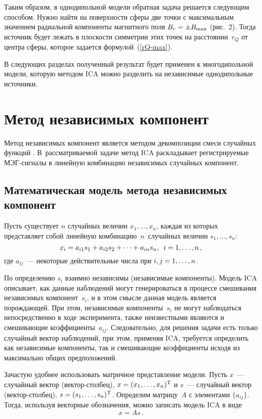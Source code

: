 \begin{multicols}{2}
Таким образом, в однодипольной модели обратная задача решается
следующим способом. Нужно найти на поверхности сферы две точки с
максимальным значением радиальной компоненты магнитного поля $B_r \hm=
\pm B_{\max}$ (рис.~2). Тогда источник будет лежать в
плоскости симметрии этих точек на расстоянии~$r_Q$ от центра сферы,
которое задается формулой~(\ref{rQ-max}).



В следующих разделах полученный результат будет применен к
многодипольной модели, которую методом ICA можно разделить  на
независимые однодипольные источники.

\section{Метод независимых компонент}

Метод независимых компонент
является методом декомпозиции смеси случайных функций \cite{ICA}.
В~рассматриваемой задаче метод ICA раскладывает регистрируемые
МЭГ-сиг\-на\-лы в линейную комбинацию независимых случайных компонент.

\subsection{Математическая модель метода независимых компонент}

Пусть существует $n$ случайных величин $x_{1}, \ldots, x_{n}$,
каждая из которых представляет собой линейную комбинацию~$n$~случайных
величин $s_{1}, \ldots, s_{n}$:
$$
x_{i} = a_{i1}s_{1} + a_{i2}s_{2} + \cdots + a_{in}s_{n}, \enskip
i=1, \ldots, n\,,
$$
где $a_{ij}$~--- некоторые действительные числа при $i,j\hm=1, \ldots, n$.

По определению $s_i$ взаимно независимы (независимые компоненты).
Модель ICA описывает, как данные наблюдений могут генерироваться в
процессе смешивания независимых компонент~$s_{i}$, и в этом смысле
данная модель является порождающей. При этом, независимые компоненты~$s_i$
не могут наблюдаться непосредственно в ходе эксперимента,
также неизвестными являются и смешивающие коэффициенты~$a_{ij}$.
Следовательно, для решения задачи есть только случайный вектор
наблюдений, при этом, применяя ICA, требуется определить как
независимые компоненты, так и смешивающие коэффициенты исходя из
максимально общих предположений.

Зачастую удобнее использовать матричное представление модели. Пусть
$x$~--- случайный вектор (век\-тор-стол\-бец), $x \hm= (x_1, \ldots, x_n)^{\mathrm{T}}$
и $s$~--- случайный вектор (век\-тор-стол\-бец), $s \hm= (s_{1}, \ldots,
s_{n})^{\mathrm{T}}$. Определим матрицу~$A$ с элементами $\{a_{ij}\}$. Тогда,
используя векторные обозначения, можно записать модель ICA в виде
$$
x = A s \,.
$$


\end{multicols}
